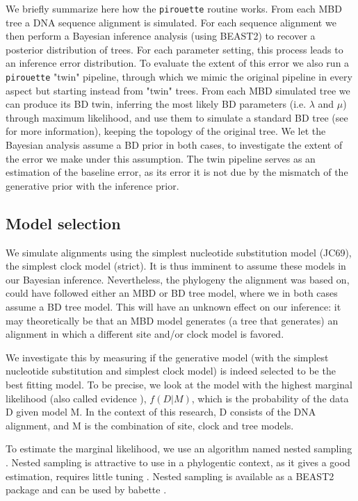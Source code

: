 We briefly summarize here how the \verb;pirouette; routine works.
From each MBD tree a DNA sequence alignment is simulated. 
For each sequence alignment we then perform a Bayesian inference analysis (using BEAST2) to recover a posterior distribution of trees. 
For each parameter setting, this process leads to an inference error distribution. To evaluate the extent of this error we also run a \verb;pirouette; "twin" pipeline, through which we mimic the original pipeline in every aspect but starting instead from "twin" trees.
From each MBD simulated tree we can produce its BD twin, inferring the most likely BD parameters (i.e. $\lambda$ and $\mu$) through maximum likelihood, and use them to simulate a standard BD tree (see \cite{pirouette} for more information), keeping the topology of the original tree.
We let the Bayesian analysis assume a BD prior in both cases, to investigate the extent of the error we make under this assumption. The twin pipeline serves as an estimation of the baseline error, as its error it is not due by the mismatch of the generative prior with the inference prior.

\iffalse
\subsection{Model selection}

We simulate alignments using the simplest nucleotide substitution model (JC69),
the simplest clock model (strict). It is thus imminent to assume these
models in our Bayesian inference. Nevertheless, the phylogeny the alignment
was based on, could have followed either an MBD or BD tree model, 
where we in both cases assume a BD tree model. This will have 
an unknown effect on our inference: it may theoretically be that an MBD model
generates (a tree that generates) an alignment in which a different site 
and/or clock model is favored. 

We investigate this by measuring if the generative model (with the simplest
nucleotide substitution and simplest clock model) is indeed selected 
to be the best fitting model. 
To be precise, we look at the model 
with the highest marginal likelihood 
(also called evidence \cite{mackay2003information}),
$f(D|M)$, which is the probability of the data D given model M.
In the context of this research, D consists of the DNA alignment,
and M is the combination of site, clock and tree models.

To estimate the marginal likelihood, 
we use an algorithm named nested sampling \cite{skilling2006nested}.
Nested sampling is attractive to use
in a phylogentic context, as it gives a good estimation,
requires little tuning \cite{maturana2018}.
Nested sampling is available as a BEAST2 package
and can be used by babette \cite{babette}.

